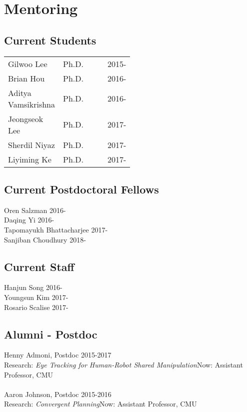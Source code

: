

\section{Mentoring} 
\subsection{Current Students}
\vspace{-1em}
\begin{center}
\begin{tabular}{lrlp{0.5\linewidth}l}
Gilwoo Lee & Ph.D. &  & & 2015-\\
Brian Hou & Ph.D. & & & 2016-\\
Aditya Vamsikrishna & Ph.D. & & & 2016-\\
Jeongseok Lee & Ph.D. & & & 2017-\\
Sherdil Niyaz & Ph.D. & & & 2017-\\
Liyiming Ke & Ph.D. & & & 2017-\\
\end{tabular}
\end{center}

\subsection{Current Postdoctoral Fellows}
\noindent
Oren Salzman \hfill 2016-\\
Daqing Yi \hfill 2016-\\
Tapomayukh Bhattacharjee \hfill 2017-\\
Sanjiban Choudhury \hfill 2018-\\

\subsection{Current Staff}
\noindent
Hanjun Song \hfill 2016-\\
Youngsun Kim \hfill 2017-\\
Rosario Scalise \hfill 2017-\\

\subsection{Alumni - Postdoc}
\noindent
Henny Admoni, Postdoc \hfill 2015-2017\\
Research: \textit{Eye Tracking for Human-Robot Shared Manipulation}\hfill Now: Assistant Professor, CMU\\
\\
Aaron Johnson, Postdoc \hfill 2015-2016\\
Research: \textit{Convergent Planning}\hfill Now: Assistant Professor, CMU\\

